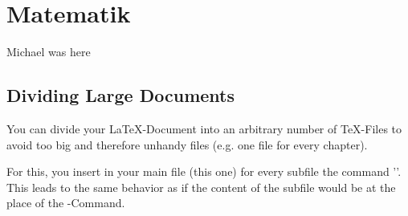 \chapter{Matematik}
Michael was here

\section{Dividing Large Documents}\label{dividing}
You can divide your \LaTeX-Document into an arbitrary number of \TeX-Files
to avoid too big and therefore unhandy files (e.g. one file for every chapter).

For this, you insert in your main file (this one) for every subfile
the command '\verb##'. This leads to the same behavior
as if the content of the subfile would be at the place of the \verb##-Command.

